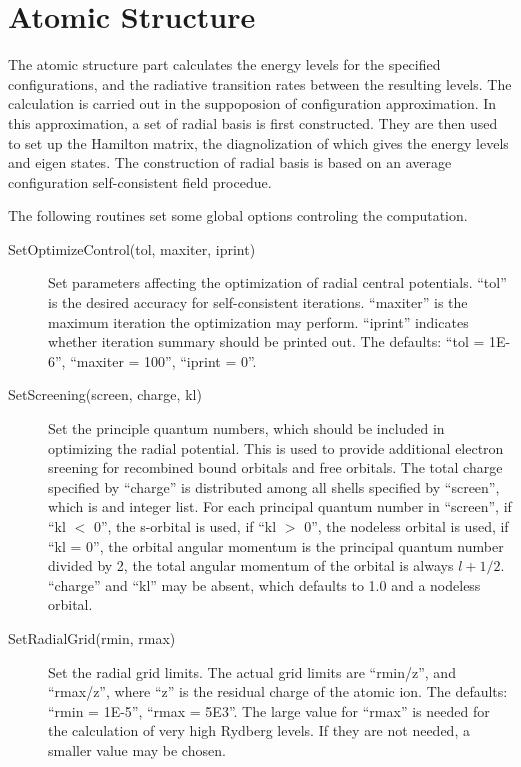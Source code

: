 \documentclass[12pt]{article}
\begin{document}
\section{Atomic Structure}
The atomic structure part calculates the energy levels for the specified
configurations, and the radiative transition rates between the resulting
levels. The calculation is carried out in the suppoposion of configuration
approximation. In this approximation, a set of radial basis is first
constructed. They are then used to set up the Hamilton matrix, the
diagnolization of which gives the energy levels and eigen states. The
construction of radial basis is based on an average configuration
self-consistent field procedue. 

The following routines set some global options controling the computation.
\begin{description}
\item[SetOptimizeControl(tol, maxiter, iprint)] 
Set parameters affecting the optimization of radial central potentials. 
``tol'' is the desired accuracy for self-consistent iterations. ``maxiter'' is
the maximum iteration the optimization may perform. ``iprint'' indicates
whether iteration summary should be printed out. The defaults: ``tol = 1E-6'',
``maxiter = 100'', ``iprint = 0''. 

\item[SetScreening(screen, charge, kl)] 
Set the principle quantum numbers, which should be included in optimizing the
radial potential. This is used to provide additional electron sreening for
recombined bound orbitals and free orbitals. The total charge specified by
``charge'' is distributed among all shells specified by ``screen'', which is
and integer list. For each principal quantum number in ``screen'', if ``kl $<$
0'', the s-orbital is used, if ``kl $>$ 0'', the nodeless orbital is used, if
``kl = 0'', the orbital angular momentum is the principal quantum number
divided by 2, the total angular momentum of the orbital is always
$l+1/2$.  ``charge'' and ``kl'' may be absent, which defaults to 1.0 and a
nodeless orbital. 

\item[SetRadialGrid(rmin, rmax)]
Set the radial grid limits. The actual grid limits are ``rmin/z'', and 
``rmax/z'', where ``z'' is the residual charge of the atomic ion. The
defaults: ``rmin = 1E-5'', ``rmax = 5E3''. The large value for ``rmax'' is
needed for the calculation of very high Rydberg levels. If they are not needed,
a smaller value may be chosen. 


\end{description}
\end{document}
